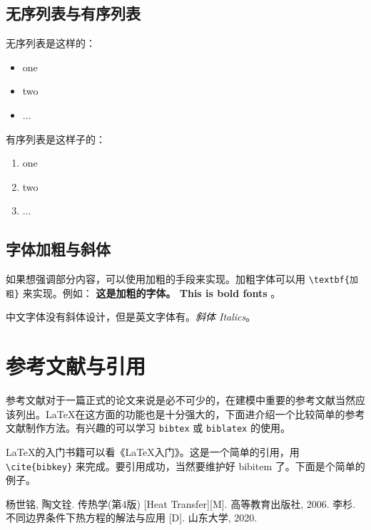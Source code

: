 \documentclass[withoutpreface,bwprint]{cumcmthesis} %
\numberwithin{equation}{subsection}
\begin{document}
\subsection{无序列表与有序列表}

无序列表是这样的：
\begin{itemize}
    \item one
    \item two
    \item ...
\end{itemize}

有序列表是这样子的：
\begin{enumerate}
    \item one
    \item two
    \item ...
\end{enumerate}

\subsection{字体加粗与斜体}

如果想强调部分内容，可以使用加粗的手段来实现。加粗字体可以用 \verb|\textbf{加粗}| 来实现。例如： \textbf{这是加粗的字体。 This is bold fonts} 。

中文字体没有斜体设计，但是英文字体有。\textit{斜体 Italics}。

\section{参考文献与引用}

参考文献对于一篇正式的论文来说是必不可少的，在建模中重要的参考文献当然应该列出。\LaTeX{}在这方面的功能也是十分强大的，下面进介绍一个比较简单的参考文献制作方法。有兴趣的可以学习 \verb|bibtex| 或 \verb|biblatex| 的使用。

\LaTeX{}的入门书籍可以看《\LaTeX{}入门》\cite{liuhaiyang2013latex}。这是一个简单的引用，用 \verb|\cite{bibkey}| 来完成。要引用成功，当然要维护好 bibitem 了。下面是个简单的例子。

\newpage

\begin{thebibliography}{9}%
    杨世铭, 陶文铨. 传热学(第4版) [Heat Transfer][M]. 高等教育出版社, 2006.
    \bibitem{}李杉. 不同边界条件下热方程的解法与应用 [D]. 山东大学, 2020.
\end{thebibliography}
\end{document}

